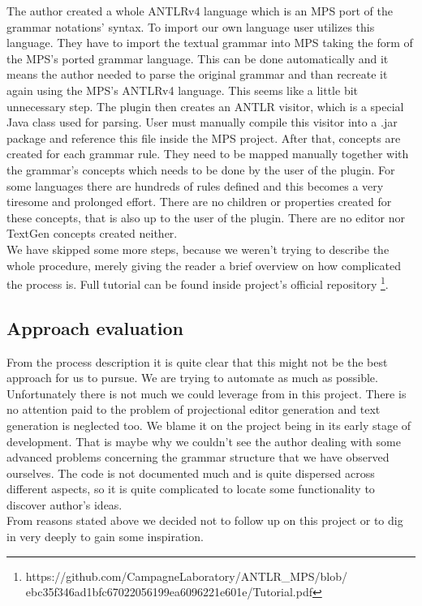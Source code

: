 The author created a whole ANTLRv4 language which is an MPS port of the grammar notations' syntax. To import our own language user utilizes this language. They have to import the textual grammar into MPS taking the form of the MPS's ported grammar language. This can be done automatically and it means the author needed to parse the original grammar and than recreate it again using the MPS's ANTLRv4 language. This seems like a little bit unnecessary step. The plugin then creates an ANTLR visitor, which is a special Java class used for parsing. User must manually compile this visitor into a .jar package and reference this file inside the MPS project. After that, concepts are created for each grammar rule. They need to be mapped manually together with the grammar's concepts which needs to be done by the user of the plugin. For some languages there are hundreds of rules defined and this becomes a very tiresome and prolonged effort. There are no children or properties created for these concepts, that is also up to the user of the plugin. There are no editor nor TextGen concepts created neither.
\\

We have skipped some more steps, because we weren't trying to describe the whole procedure, merely giving the reader a brief overview on how complicated the process is. Full tutorial can be found inside project's official repository \footnote{https://github.com/CampagneLaboratory/ANTLR{\_}MPS/blob/ ebc35f346ad1bfc67022056199ea6096221e601e/Tutorial.pdf}.

\subsection{Approach evaluation}
From the process description it is quite clear that this might not be the best approach for us to pursue. We are trying to automate as much as possible. Unfortunately there is not much we could leverage from in this project. There is no attention paid to the problem of projectional editor generation and text generation is neglected too. We blame it on the project being in its early stage of development. That is maybe why we couldn't see the author dealing with some advanced problems concerning the grammar structure that we have observed ourselves. The code is not documented much and is quite dispersed across different aspects, so it is quite complicated to locate some functionality to discover author's ideas.
\\

From reasons stated above we decided not to follow up on this project or to dig in very deeply to gain some inspiration.